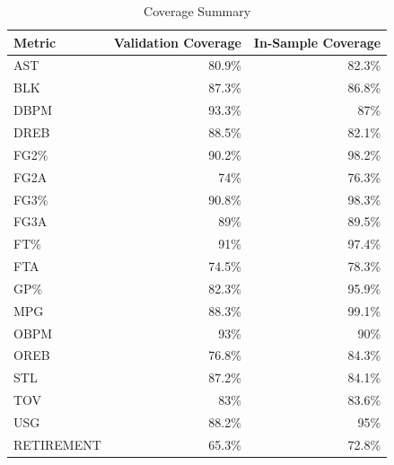 \begin{table}[t]
\caption*{
{\large Coverage Summary}
} 
\fontsize{12.0pt}{14.4pt}\selectfont
\begin{tabular*}{\linewidth}{@{\extracolsep{\fill}}lrr}
\toprule
Metric & Validation Coverage & In-Sample Coverage \\ 
\midrule\addlinespace[2.5pt]
AST & 80.9\% & 82.3\% \\ 
BLK & 87.3\% & 86.8\% \\ 
DBPM & 93.3\% & 87\% \\ 
DREB & 88.5\% & 82.1\% \\ 
FG2\% & 90.2\% & 98.2\% \\ 
FG2A & 74\% & 76.3\% \\ 
FG3\% & 90.8\% & 98.3\% \\ 
FG3A & 89\% & 89.5\% \\ 
FT\% & 91\% & 97.4\% \\ 
FTA & 74.5\% & 78.3\% \\ 
GP\% & 82.3\% & 95.9\% \\ 
MPG & 88.3\% & 99.1\% \\ 
OBPM & 93\% & 90\% \\ 
OREB & 76.8\% & 84.3\% \\ 
STL & 87.2\% & 84.1\% \\ 
TOV & 83\% & 83.6\% \\ 
USG & 88.2\% & 95\% \\ 
RETIREMENT & 65.3\% & 72.8\% \\ 
\bottomrule
\end{tabular*}
\end{table}

